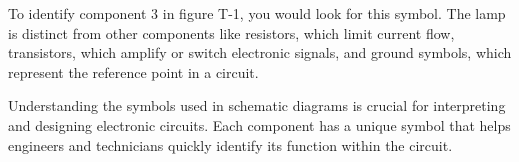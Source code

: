 To identify component 3 in figure T-1, you would look for this symbol. The lamp is distinct from other components like resistors, which limit current flow, transistors, which amplify or switch electronic signals, and ground symbols, which represent the reference point in a circuit. 

Understanding the symbols used in schematic diagrams is crucial for interpreting and designing electronic circuits. Each component has a unique symbol that helps engineers and technicians quickly identify its function within the circuit.


